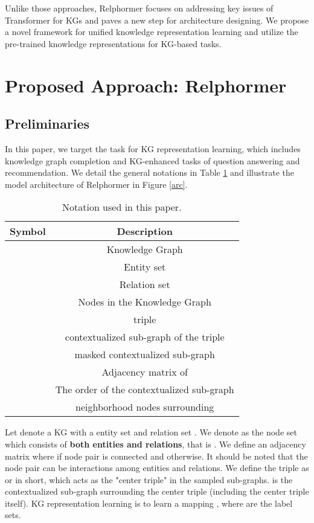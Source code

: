 \documentclass[sigconf]{acmart}
\begin{document}
Unlike those approaches, Relphormer focuses on addressing key issues of Transformer for KGs and paves a new step for architecture designing. 
We propose a novel framework for unified knowledge representation learning and utilize the pre-trained knowledge representations for KG-based tasks.


 

\section{Proposed Approach: Relphormer}
\subsection{Preliminaries}
In this paper, we target the task for KG representation learning, which includes knowledge graph completion and KG-enhanced tasks of question answering and recommendation.
We detail the general notations in Table \ref{table:Definition_Notation} and illustrate the  model architecture of Relphormer in Figure \ref{arc}.

\begin{table}[!t]
    \caption{Notation used in this paper.}
        
    \centering
\begin{tabular}{cc}
            \toprule
            \textbf{Symbol}  & \textbf{Description}\\
            \midrule
             & Knowledge Graph
            \\    
              & Entity set
            \\  
              & Relation set
            \\  
              & Nodes in the Knowledge Graph
            \\  
              & triple 
            \\  
             & contextualized sub-graph of the triple 
            \\
             & masked contextualized sub-graph 
            \\ 
              & Adjacency matrix of 
            \\
              & The order of the contextualized sub-graph
            \\
             & neighborhood nodes surrounding 
            \\
            \bottomrule
        \end{tabular}
\label{table:Definition_Notation}
\end{table}%
Let  denote a KG with a entity set  and relation set .
We denote  as the node set which consists of \textbf{both entities and relations}, that is .
We define an adjacency matrix  where  if node pair  is connected and  otherwise. 
It should be noted that the node pair  can be interactions among entities and relations.
We define the triple as   or  in short, which acts as the "center triple" in the sampled sub-graphs.
 is the contextualized sub-graph surrounding the center triple (including the center triple itself).
KG representation learning is to learn a mapping , where   are the label sets.
\end{document}
